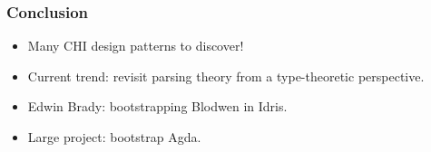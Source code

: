 \documentclass[t,fleqn,usenames,dvipsnames]{beamer}
\begin{document}
\begin{frame}%
  \frametitle{Conclusion}
  \vspace{-3ex}
  \begin{itemize}
  \item Many CHI design patterns to discover!
  \item Current trend: revisit parsing theory from a type-theoretic
    perspective.
  \item Edwin Brady: bootstrapping Blodwen in Idris.
  \item Large project: bootstrap Agda.
  \end{itemize}
\end{frame}





% 
\end{document}

